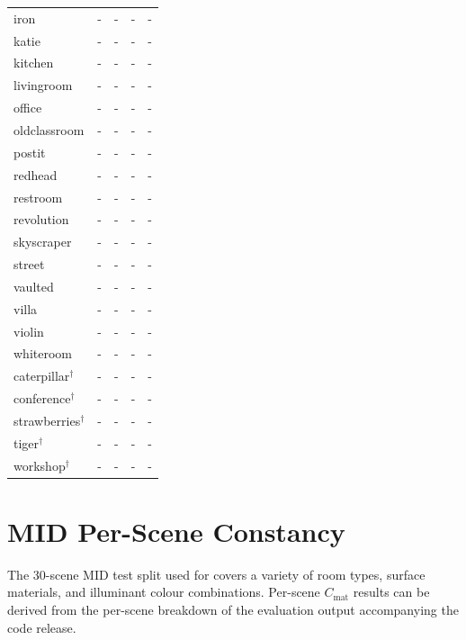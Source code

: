 \begin{longtable}{@{}lcccc@{}}
  iron         & - & - & - & - \\
  katie        & - & - & - & - \\
  kitchen      & - & - & - & - \\
  livingroom   & - & - & - & - \\
  office       & - & - & - & - \\
  oldclassroom & - & - & - & - \\
  postit       & - & - & - & - \\
  redhead      & - & - & - & - \\
  restroom     & - & - & - & - \\
  revolution   & - & - & - & - \\
  skyscraper   & - & - & - & - \\
  street       & - & - & - & - \\
  vaulted      & - & - & - & - \\
  villa        & - & - & - & - \\
  violin       & - & - & - & - \\
  whiteroom    & - & - & - & - \\
  \midrule
  caterpillar$^\dagger$  & - & - & - & - \\
  conference$^\dagger$   & - & - & - & - \\
  strawberries$^\dagger$ & - & - & - & - \\
  tiger$^\dagger$        & - & - & - & - \\
  workshop$^\dagger$     & - & - & - & - \\
\end{longtable}
\endgroup


\section{MID Per-Scene Constancy}

The 30-scene MID test split used for  covers a variety of room
types, surface materials, and illuminant colour combinations.
Per-scene $C_{\text{mat}}$ results can be derived from the per-scene breakdown
of the evaluation output accompanying the code release.

